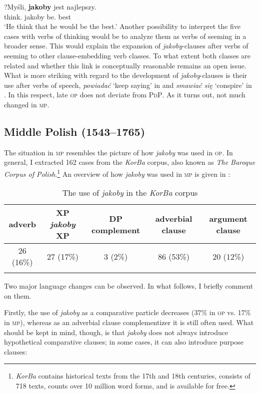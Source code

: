 \documentclass[output=paper
,modfonts
,nonflat]{langsci/langscibook}
\begin{document}
\ea \gll ?Myśli, \textbf{jakoby} jest najlepszy. \label{portugal} \\
		think.{\thirdperson}{\sg} jakoby be.{\thirdperson}{\sg} best \\
\glt	 `He think that he would be the best.'
\z
Another possibility to interpret the five cases with verbs of thinking would be to analyze them as verbs of seeming in a broader sense. This would explain the expansion of \emph{jakoby}-clauses after verbs of seeming to other clause-embedding verb classes. To what extent both classes are related and whether this link is conceptually reasonable remains an open issue. What is more striking with regard to the development of \emph{jakoby}-clauses is their use after verbs of speech, \emph{powiadać} `keep saying' in  and \emph{smawiać się} `conspire' in . In this respect, late \textsc{op} does not deviate from \textsc{PdP}. As it turns out, not much changed in \textsc{mp}.        

\subsection{Middle Polish (1543--1765)}

The situation in \textsc{mp} resembles the picture of how \emph{jakoby} was used in \textsc{op}. In general, I extracted 162 cases from the \emph{KorBa} corpus, also known as \emph{The Baroque Corpus of Polish}.\footnote{\emph{KorBa} contains historical texts from the 17th and 18th centuries, consists of 718 texts, counts over 10 million word forms, and is available for free. 
}    
An overview of how \emph{jakoby} was used in \textsc{mp} is given in :

\begin{table}[h]  \begin{tabular}{ccccc} 
\lsptoprule
adverb & XP \emph{jakoby} XP & DP complement  & \newline adverbial clause & argument clause \\
\midrule
 26 (16\%) & 27 (17\%) & 3 (2\%) & 86 (53\%) & 20 (12\%)  \\
 \lspbottomrule
\end{tabular}
\caption{The use of \emph{jakoby} in the \emph{KorBa} corpus} \label{mlodopolski_statystka}
\end{table}

\noindent  Two major language changes can be observed. In what follows, I briefly comment on them. 

Firstly, the use of \emph{jakoby} as a comparative particle decreases (37\% in \textsc{op} vs. 17\% in \textsc{mp}), whereas as an adverbial clause complementizer it is still often used. What should be kept in mind, though, is that \emph{jakoby} does not always introduce hypothetical comparative clauses; in some cases, it can also introduce purpose clauses: 
\end{document}
